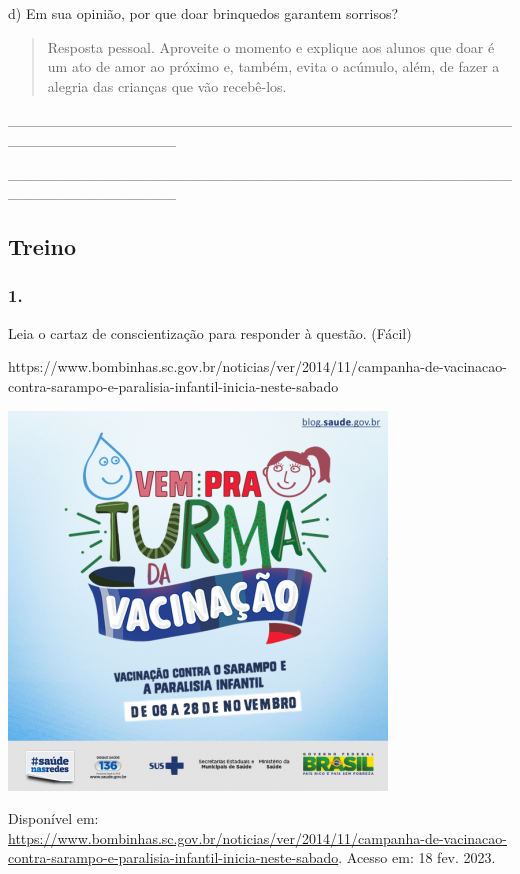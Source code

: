 d) Em sua opinião, por que doar brinquedos garantem sorrisos?

\begin{quote}
Resposta pessoal. Aproveite o momento e explique aos alunos que doar é
um ato de amor ao próximo e, também, evita o acúmulo, além, de fazer a
alegria das crianças que vão recebê-los.
\end{quote}

\_\_\_\_\_\_\_\_\_\_\_\_\_\_\_\_\_\_\_\_\_\_\_\_\_\_\_\_\_\_\_\_\_\_\_\_\_\_\_\_\_\_\_\_\_\_\_\_\_\_\_\_\_\_\_\_\_\_\_\_\_\_\_\_

\_\_\_\_\_\_\_\_\_\_\_\_\_\_\_\_\_\_\_\_\_\_\_\_\_\_\_\_\_\_\_\_\_\_\_\_\_\_\_\_\_\_\_\_\_\_\_\_\_\_\_\_\_\_\_\_\_\_\_\_\_\_\_\_

\subsection{Treino}\label{treino-3}

\subsubsection{1.}\label{section-44}

Leia o cartaz de conscientização para responder à questão. (Fácil)

https://www.bombinhas.sc.gov.br/noticias/ver/2014/11/campanha-de-vacinacao-contra-sarampo-e-paralisia-infantil-inicia-neste-sabado

\includegraphics[width=3.95833in,height=3.95833in]{media/image12.png}

Disponível em:
\url{https://www.bombinhas.sc.gov.br/noticias/ver/2014/11/campanha-de-vacinacao-contra-sarampo-e-paralisia-infantil-inicia-neste-sabado}.
Acesso em: 18 fev. 2023.

